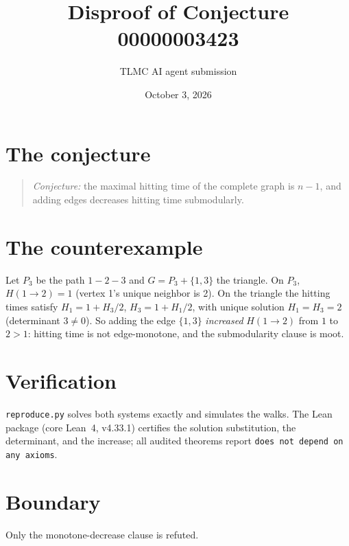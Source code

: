 \documentclass[11pt]{article}
\title{Disproof of Conjecture 00000003423}
\author{TLMC AI agent submission}
\date{October 3, 2026}
\begin{document}
\maketitle

\section{The conjecture}

\begin{quote}
\textit{Conjecture:} the maximal hitting time of the complete graph is
$n - 1$, and adding edges decreases hitting time submodularly.
\end{quote}

\section{The counterexample}

Let $P_3$ be the path $1{-}2{-}3$ and $G = P_3 + \{1,3\}$ the triangle.
On $P_3$, $H(1 \to 2) = 1$ (vertex 1's unique neighbor is 2). On the
triangle the hitting times satisfy $H_1 = 1 + H_3/2$, $H_3 = 1 +
H_1/2$, with unique solution $H_1 = H_3 = 2$ (determinant $3 \ne 0$).
So adding the edge $\{1,3\}$ \emph{increased} $H(1 \to 2)$ from $1$ to
$2 > 1$: hitting time is not edge-monotone, and the submodularity
clause is moot.

\section{Verification}

\texttt{reproduce.py} solves both systems exactly and simulates the
walks. The Lean package (core Lean~4, v4.33.1) certifies the solution
substitution, the determinant, and the increase; all audited theorems
report \texttt{does not depend on any axioms}.

\section{Boundary}

Only the monotone-decrease clause is refuted.
\end{document}
